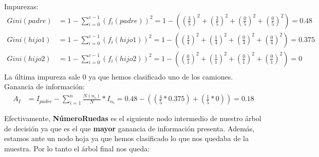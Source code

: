 \documentclass [a4paper] {article}
\begin{document}
\begin{enumerate}
		Impurezas:
		\begin{align*}
			Gini(padre) &= 1 - \sum_{i=0}^{c-1}(f_i(padre))^2 = 
			1 - \left(\left(\frac{3}{5}\right)^2+\left(\frac{2}{5}\right)^2+\left(\frac{0}{5}\right)^2+\left(\frac{0}{5}\right)^2\right) = 0.48 \\
			Gini(hijo 1) &= 1 - \sum_{i=0}^{c-1}(f_i(hijo 1))^2 = 
			1 - \left(\left(\frac{3}{4}\right)^2+\left(\frac{1}{4}\right)^2+\left(\frac{0}{4}\right)^2+\left(\frac{0}{4}\right)^2\right) = 0.375 \\
			Gini(hijo 2) &= 1 - \sum_{i=0}^{c-1}(f_i(hijo 2))^2 = 
			1 - \left(\left(\frac{0}{1}\right)^2+\left(\frac{1}{1}\right)^2+\left(\frac{0}{1}\right)^2+\left(\frac{0}{1}\right)^2\right) = 0 \\
		\end{align*}
		La última impureza sale 0 ya que hemos clasificado uno de los camiones.
		Ganancia de información:
		\begin{align*}
			A_I &= I_{padre} - \sum_{i=1}^{n}\frac{N(n_i)}{N}*I_{n_i} = 0.48 - ((\frac{4}{5}*0.375)+(\frac{1}{5}*0)) = 0.18
		\end{align*}
	
\end{enumerate}

Efectivamente, \textbf{NúmeroRuedas} es el siguiente nodo intermedio de nuestro árbol de decisión ya que es el que \textbf{mayor} ganancia de información
presenta. Además, estamos ante un nodo hoja ya que hemos clasificado lo que nos quedaba de la muestra. Por lo tanto el árbol final nos queda:

\newpage

\begin{center}
\end{center}
\end{document}
